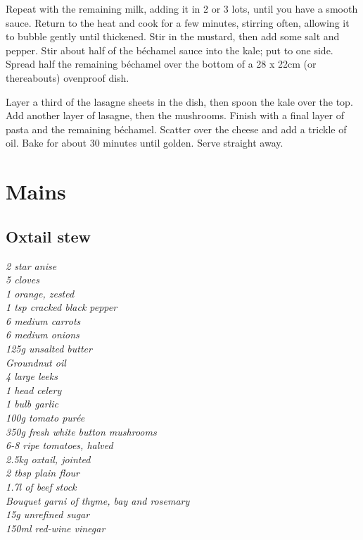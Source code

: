 \documentclass{tufte-book}
\begin{document}
Repeat with the remaining milk, adding it in 2 or 3 lots, until you have a smooth sauce. Return to the heat and cook for a few minutes, stirring often, allowing it to bubble gently until thickened. Stir in the mustard, then add some salt and pepper. Stir about half of the b\'echamel sauce into the kale; put to one side. Spread half the remaining b\'echamel over the bottom of a 28 x 22cm (or thereabouts) ovenproof dish.

Layer a third of the lasagne sheets in the dish, then spoon the kale over the top. Add another layer of lasagne, then the mushrooms. Finish with a final layer of pasta and the remaining b\'echamel. Scatter over the cheese and add a trickle of oil. Bake for about 30 minutes until golden. Serve straight away.


\chapter{Mains}

\section{Oxtail stew}

\smallskip
\emph{2 star anise 
\\5 cloves 
\\1 orange, zested 
\\1 tsp cracked black pepper 
\\6 medium carrots 
\\6 medium onions 
\\125g unsalted butter 
\\Groundnut oil 
\\4 large leeks 
\\1 head celery 
\\1 bulb garlic 
\\100g tomato pur\'ee
\\350g fresh white button mushrooms 
\\6-8 ripe tomatoes, halved  
\\2.5kg oxtail, jointed
\\2 tbsp plain flour 
\\1.7l of beef stock
\\Bouquet garni of thyme, bay and rosemary
\\15g unrefined sugar 
\\150ml red-wine vinegar}
\end{document}
